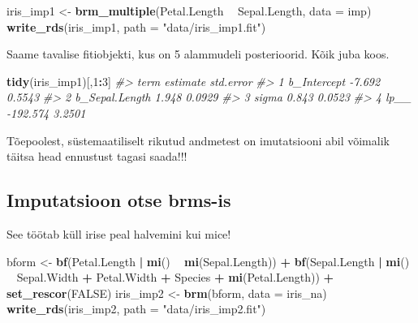 \documentclass[]{book}
\newenvironment{Shaded}{\begin{snugshade}}{\end{snugshade}}
\newcommand{\KeywordTok}[1]{\textcolor[rgb]{0.13,0.29,0.53}{\textbf{#1}}}
\newcommand{\DataTypeTok}[1]{\textcolor[rgb]{0.13,0.29,0.53}{#1}}
\newcommand{\DecValTok}[1]{\textcolor[rgb]{0.00,0.00,0.81}{#1}}
\newcommand{\StringTok}[1]{\textcolor[rgb]{0.31,0.60,0.02}{#1}}
\newcommand{\CommentTok}[1]{\textcolor[rgb]{0.56,0.35,0.01}{\textit{#1}}}
\newcommand{\OtherTok}[1]{\textcolor[rgb]{0.56,0.35,0.01}{#1}}
\newcommand{\OperatorTok}[1]{\textcolor[rgb]{0.81,0.36,0.00}{\textbf{#1}}}
\newcommand{\NormalTok}[1]{#1}
\begin{document}
\begin{Shaded}
\begin{Highlighting}[]
\NormalTok{iris_imp1 <-}\StringTok{ }\KeywordTok{brm_multiple}\NormalTok{(Petal.Length }\OperatorTok{~}\StringTok{ }\NormalTok{Sepal.Length, }\DataTypeTok{data =}\NormalTok{ imp)}
\KeywordTok{write_rds}\NormalTok{(iris_imp1, }\DataTypeTok{path =} \StringTok{"data/iris_imp1.fit"}\NormalTok{)}
\end{Highlighting}
\end{Shaded}

Saame tavalise fitiobjekti, kus on 5 alammudeli posterioorid. Kõik juba
koos.

\begin{Shaded}
\begin{Highlighting}[]
\KeywordTok{tidy}\NormalTok{(iris_imp1)[,}\DecValTok{1}\OperatorTok{:}\DecValTok{3}\NormalTok{]}
\CommentTok{#>             term estimate std.error}
\CommentTok{#> 1    b_Intercept   -7.692    0.5543}
\CommentTok{#> 2 b_Sepal.Length    1.948    0.0929}
\CommentTok{#> 3          sigma    0.843    0.0523}
\CommentTok{#> 4           lp__ -192.574    3.2501}
\end{Highlighting}
\end{Shaded}

Tõepoolest, süstemaatiliselt rikutud andmetest on imutatsiooni abil
võimalik täitsa head ennustust tagasi saada!!!

\subsection*{Imputatsioon otse brms-is}\label{imputatsioon-otse-brms-is}

See töötab küll irise peal halvemini kui mice!

\begin{Shaded}
\begin{Highlighting}[]
\NormalTok{bform <-}\StringTok{ }\KeywordTok{bf}\NormalTok{(Petal.Length }\OperatorTok{|}\StringTok{ }\KeywordTok{mi}\NormalTok{() }\OperatorTok{~}\StringTok{ }\KeywordTok{mi}\NormalTok{(Sepal.Length)) }\OperatorTok{+}\StringTok{ }
\StringTok{  }\KeywordTok{bf}\NormalTok{(Sepal.Length }\OperatorTok{|}\StringTok{ }\KeywordTok{mi}\NormalTok{() }\OperatorTok{~}\StringTok{ }\NormalTok{Sepal.Width }\OperatorTok{+}\StringTok{ }\NormalTok{Petal.Width }\OperatorTok{+}\StringTok{ }\NormalTok{Species }\OperatorTok{+}\StringTok{ }\KeywordTok{mi}\NormalTok{(Petal.Length)) }\OperatorTok{+}\StringTok{ }\KeywordTok{set_rescor}\NormalTok{(}\OtherTok{FALSE}\NormalTok{)}
\NormalTok{iris_imp2 <-}\StringTok{ }\KeywordTok{brm}\NormalTok{(bform, }\DataTypeTok{data =}\NormalTok{ iris_na)}
\KeywordTok{write_rds}\NormalTok{(iris_imp2, }\DataTypeTok{path =} \StringTok{"data/iris_imp2.fit"}\NormalTok{)}
\end{Highlighting}
\end{Shaded}
\end{document}
